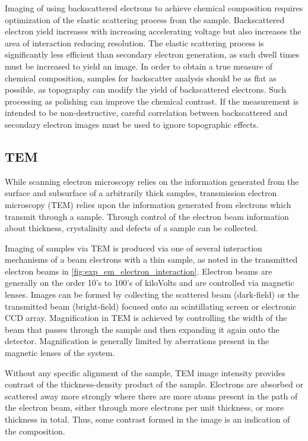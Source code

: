 Imaging of using backscattered electrons to achieve chemical composition requires optimization of the elastic scattering process from the sample. Backscattered electron yield increases with increasing accelerating voltage but also increases the area of interaction reducing resolution. The elastic scattering process is significantly less efficient than secondary electron generation, as such dwell times must be increased to yield an image. In order to obtain a true measure of chemical composition, samples for backscatter analysis should be as flat as possible, as topography can modify the yield of backscattered electrons. Such processing as polishing can improve the chemical contrast. If the measurement is intended to be non-destructive, careful correlation between backscattered and secondary electron images must be used to ignore topographic effects.
\subsection{TEM}
While scanning electron microscopy relies on the information generated from the surface and subsurface of a arbitrarily thick samples, transmission electron microscopy (TEM) relies upon the information generated from electrons which transmit through a sample. Through control of the electron beam information about thickness, crystalinity and defects of a sample can be collected.

Imaging of samples via TEM is produced via one of several interaction mechanisms of a beam electrons with a thin sample, as noted in the transmitted electron beams in \cref{fig:exp_em_electron_interaction}. Electron beams are generally on the order 10's to 100's of kiloVolts and are controlled via magnetic lenses. Images can be formed by collecting the scattered beam (dark-field) or the transmitted beam (bright-field) focused onto an scintillating screen or electronic CCD array. Magnification in TEM is achieved by controlling the width of the beam that passes through the sample and then expanding it again onto the detector. Magnification is generally limited by aberrations present in the magnetic lenses of the system.

Without any specific alignment of the sample, TEM image intensity provides contrast of the thickness-density product of the sample. Electrons are absorbed or scattered away more strongly where there are more atoms present in the path of the electron beam, either through more electrons per unit thickness, or more thickness in total. Thus, some contrast formed in the image is an indication of the composition.

